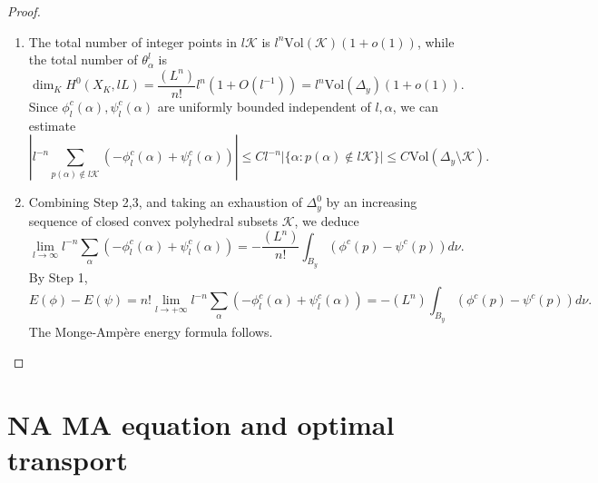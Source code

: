 \documentclass[a4paper]{article}
\theoremstyle{definition}
\begin{document}
\begin{proof}
\begin{enumerate}
				
				
				Thus the Riemann sum converges as $l\to +\infty$,
				\[
					l^{-n} \sum_{  p(\alpha)\in l\mathcal{K} }  \phi^c( l^{-1}p(\alpha))\to \int_\mathcal{K}  \phi^c(p)   d\tilde{\nu} = \frac{   ( L^n)}{n!}  \int_{\mathcal{K}}   \phi^c(p)   d\nu.
				\]
				Since the total number of integer points in $l\mathcal{K}$ is $O(l^n)$, the $O(\epsilon_l)$ term can be neglected, so 
				\[
				\lim_{l\to \infty} l^{-n} \sum_{ \alpha: p(\alpha)\in l \mathcal{K} }  ( - \phi^c_l(\alpha)+\psi^c_l(\alpha) )= - \frac{   ( L^n)}{n!}  \int_{\mathcal{K}}   (\phi^c(p)-\psi^c(p) )   d\nu.
				\]
				
				
				\item  The total number of integer points in $l\mathcal{K}$ is $l^n \text{Vol}(\mathcal{K}) (1+o(1))$, while the total number of $\theta_\alpha^l$ is 
				\[
				\dim_K H^0(X_K, lL) = \frac{ (L^n)}{n! } l^n(1+O(l^{-1}) ) = l^n \text{Vol}(\Delta_y) (1+o(1)).
				\]
				Since $\phi_l^c(\alpha), \psi_l^c(\alpha)$ are uniformly bounded independent of $l, \alpha$, we can estimate
				\[
				|  l^{-n} \sum_{  p(\alpha)\notin l \mathcal{K} }  (-\phi^c_l(\alpha )+ \psi^c_l(\alpha)) | \leq C l^{-n} | \{    \alpha: p(\alpha) \notin l\mathcal{K}       \}| \leq C\text{Vol}(\Delta_y\setminus \mathcal{K}).
				\]
				
				
				
				\item 
				
				Combining Step 2,3, and taking an exhaustion of $\Delta_y^0$ by an increasing sequence of closed convex polyhedral subsets $\mathcal{K}$, we deduce
				\[
					\lim_{l\to \infty} l^{-n} \sum_{ \alpha}  ( - \phi^c_l(\alpha)+\psi^c_l(\alpha) )= - \frac{   ( L^n)}{n!}  \int_{B_y}   (\phi^c(p)-\psi^c(p) )   d\nu.
				\]
				By Step 1,
				\[
					E(\phi)-E(\psi)
				=  n!  \lim_{l\to+\infty} l^{-n} \sum_{  \alpha }  (-\phi^c_l(\alpha )+ \psi^c_l(\alpha))= -(L^n) \int_{B_y}   (\phi^c(p)-\psi^c(p) )   d\nu.
				\]
				The Monge-Amp\`ere energy formula follows.
			\end{enumerate}
	\end{proof}
	
	

	
	
	
	
	
	
	
	
	
		
	
	\section{NA MA equation and optimal transport}\label{sec:NAMAoptimaltransport}
	
\end{document}
